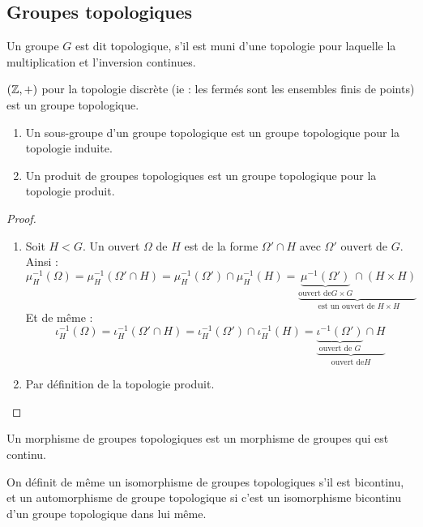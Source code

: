 \subsection{Groupes topologiques}
\vspace{0.5em}

\begin{defi}

Un groupe $G$ est dit topologique, s'il est muni d'une topologie pour laquelle
la multiplication et l'inversion continues.
\end{defi}

\begin{example}[Exemple]
 $(\mathbb{Z},+)$ pour la topologie discrète (ie : les fermés sont les ensembles finis
de points) est un groupe topologique.
\end{example}

\begin{prop}
 \begin{enumerate}
  \item Un sous-groupe d'un groupe topologique est un groupe topologique pour
la topologie induite.
  \item Un produit de groupes topologiques est un groupe topologique pour la
topologie produit.
 \end{enumerate}
\end{prop}

\begin{proof}\ 
 
\begin{enumerate}
 \item Soit $H < G$. Un ouvert $\Omega$ de $H$ est de la forme $\Omega'\cap H$
avec $\Omega'$ ouvert de $G$. Ainsi :
\[\mu_H^{-1}(\Omega) = \mu_H^{-1}(\Omega'\cap H) = \mu_H^{-1}(\Omega')\cap
\mu_H^{-1}(H) = \underbrace{\underbrace{\mu^{-1}(\Omega')}_{\text{ouvert de
}G \times G}\cap(H\times H)}_{\text{ est un ouvert de } H\times H}\]
Et de même :
\[\iota_H^{-1}(\Omega) = \iota_H^{-1}(\Omega'\cap H) =
\iota_H^{-1}(\Omega')\cap \iota_H^{-1}(H) = \underbrace{
\underbrace{\iota^{-1}(\Omega')}_{\text{ouvert de } G}\cap H}_{\text{ouvert de
}H}\]
\item Par définition de la topologie produit.
\end{enumerate}
\end{proof}

\begin{defi}

Un morphisme de groupes topologiques est un morphisme de groupes qui est
continu.

On définit de même un isomorphisme de groupes topologiques s'il est
bicontinu, et un automorphisme de groupe topologique si c'est un isomorphisme
bicontinu d'un groupe topologique dans lui même.
\end{defi}


